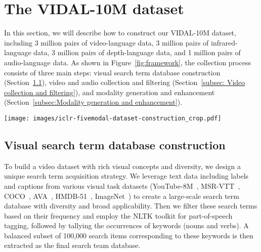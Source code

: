 \documentclass{article} \usepackage{iclr2024_conference,times}
\begin{document}
\section{The VIDAL-10M dataset}

In this section, we will describe how to construct our VIDAL-10M dataset, including 3 million pairs of video-language data, 3 million pairs of infrared-language data, 3 million pairs of depth-language data, and 1 million pairs of audio-language data. 
As shown in Figure~\ref{fig:framework}, the collection process consists of three main steps: visual search term database construction (Section~\ref{subsec:Visual search term database construction}), video and audio collection and filtering (Section~\ref{subsec: Video collection and filtering}), and modality generation and enhancement (Section~\ref{subsec:Modality generation and enhancement}).

\begin{figure*}[htbp]
\centering
\texttt{[image: images/iclr-fivemodal-dataset-construction\_crop.pdf]}
\caption{\textbf{VIDAL-10M construction.} (a) Firstly, a search term database is generated by leveraging visually related datasets. (b) Subsequently, relevant videos and audios are collected from the internet and undergo a series of filtering processes. (c)  Lastly, we perform infrared and depth modality generation, as well as multi-view text generation and enhancement.}
\label{fig:framework}
\vspace{-0.4cm} 
\end{figure*}
\subsection{Visual search term database construction}
\label{subsec:Visual search term database construction}
To build a video dataset with rich visual concepts and diversity, we design a unique search term acquisition strategy. We leverage text data including labels and captions from various visual task datasets (YouTube-8M~\citep{abu2016youtube}, MSR-VTT~\citep{xu2016msr}, COCO~\citep{lin2014microsoft}, 
AVA~\citep{gu2018ava}, HMDB-51~\citep{kuehne2011hmdb}, ImageNet~\citep{deng2009imagenet}) to create a large-scale search term database with diversity and broad applicability. Then we filter these search terms based on their frequency and employ the NLTK toolkit for part-of-speech tagging, followed by tallying the occurrences of keywords (nouns and verbs). A balanced subset of 100,000 search items corresponding to these keywords is then extracted as the final search team database. 
\end{document}
